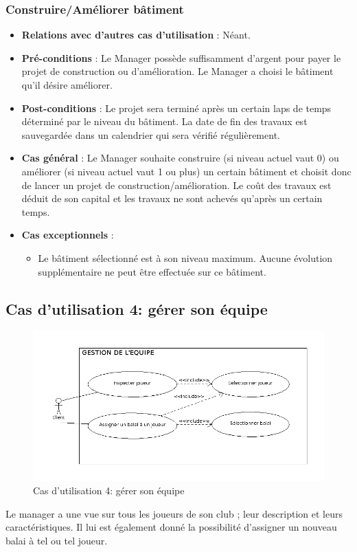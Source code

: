 \documentclass[a4paper,titlepage]{scrreprt}
\begin{document}
    \subsubsection{Construire/Améliorer bâtiment}
      \begin{itemize}
        \item \textbf{Relations avec d'autres cas d'utilisation}  : Néant.
        \item \textbf{Pré-conditions} : Le Manager possède suffisamment d’argent pour payer le projet de construction ou d’amélioration. Le Manager a choisi le bâtiment qu’il désire améliorer.
        \item \textbf{Post-conditions} : Le projet sera terminé après un certain laps de temps déterminé par le niveau du bâtiment. La date de fin des travaux est sauvegardée dans un \gls{calendrier} qui sera vérifié régulièrement.
        \item \textbf{Cas général} : Le Manager souhaite construire (si niveau actuel vaut 0) ou améliorer (si niveau actuel vaut 1 ou plus) un certain bâtiment et choisit donc de lancer un projet de construction/amélioration. Le coût des travaux est déduit de son capital et les travaux ne sont achevés qu'après un certain temps.
        \item \textbf{Cas exceptionnels} :
        \begin{itemize}
            \item Le bâtiment sélectionné est à son niveau maximum. Aucune évolution supplémentaire ne peut être effectuée sur ce bâtiment.
          \end{itemize}
      \end{itemize}

  \subsection{Cas d'utilisation 4: gérer son équipe}
  \begin{figure}[H]
    \center
    \includegraphics[scale=0.5]{uml/useCaseView/Gestiondelequipe.png}
    \caption{Cas d'utilisation 4: gérer son équipe}
  \end{figure}	
  Le manager a une vue sur tous les joueurs de son \gls{club} ;  
  leur description et leurs caractéristiques. 
  Il lui est également donné la possibilité d'assigner un nouveau balai à tel ou tel joueur.
\end{document}
